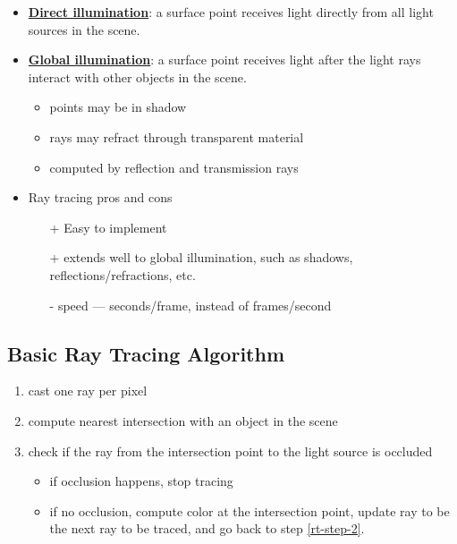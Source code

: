 \documentclass[twocolumn,landscape,10pt]{article}
\theoremstyle{definition}
\begin{document}
\begin{itemize}
    \item \underline{\textbf{Direct illumination}}: a surface point receives
        light directly from all light sources in the scene.
    \item \underline{\textbf{Global illumination}}: a surface point receives
        light after the light rays interact with other objects in the scene. 
        \begin{itemize}
            \item points may be in shadow
            \item rays may refract through transparent material
            \item computed by reflection and transmission rays
        \end{itemize} 
    \item Ray tracing pros and cons
        \begin{itemize}
            \item[+] Easy to implement
            \item[+] extends well to global illumination, such as shadows,
                reflections/refractions, etc.
            \item[-] speed --- seconds/frame, instead of frames/second
        \end{itemize} 
\end{itemize} 

\subsection{Basic Ray Tracing Algorithm}

\begin{enumerate}
    \item cast one ray per pixel
    \item\label{rt-step-2} compute nearest intersection with an object in the scene
    \item check if the ray from the intersection point to the light source is
        occluded
        \begin{itemize}
            \item if occlusion happens, stop tracing
            \item if no occlusion, compute color at the intersection point,
                update ray to be the next ray to be traced, and go back to step \ref{rt-step-2}.
        \end{itemize} 
\end{enumerate} 
\end{document}
